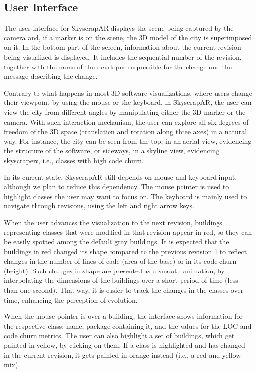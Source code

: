 \subsection{User Interface} \label{sec:user_interface}
The user interface for SkyscrapAR displays the scene being captured by the camera and, if a marker is on the scene, the 3D model of the city is superimposed on it. In the bottom part of the screen, information about the current revision being visualized is displayed. It includes the sequential number of the revision, together with the name of the developer responsible for the change and the message describing the change.

Contrary to what happens in most 3D software visualizations, where users change their viewpoint by using the mouse or the keyboard, in SkyscrapAR, the user can view the city from different angles by manipulating either the 3D marker or the camera. With such interaction mechanism, the user can explore all six degrees of freedom of the 3D space (translation and rotation along three axes) in a natural way. For instance, the city can be seen from the top, in an aerial view, evidencing the structure of the software, or sideways, in a skyline view, evidencing skyscrapers, i.e., classes with high code churn.

In its current state, SkyscrapAR still depends on mouse and keyboard input, although we plan to reduce this dependency. The mouse pointer is used to highlight classes the user may want to focus on. The keyboard is mainly used to navigate through revisions, using the left and right arrow keys.

When the user advances the visualization to the next revision, buildings representing classes that were modified in that revision appear in red, so they can be easily spotted among the default gray buildings. It is expected that the buildings in red changed its shape compared to the previous revision 1 to reflect changes in the number of lines of code (area of the base) or in its code churn (height). Such changes in shape are presented as a smooth animation, by interpolating the dimensions of the buildings over a short period of time (less than one second). That way, it is easier to track the changes in the classes over time, enhancing the perception of evolution.

When the mouse pointer is over a building, the interface shows information for the respective class: name, package containing it, and the values for the LOC and code churn metrics. The user can also highlight a set of buildings, which get painted in yellow, by clicking on them. If a class is highlighted and has changed in the current revision, it gets painted in orange instead (i.e., a red and yellow mix). 

